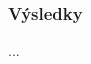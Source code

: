 \documentclass[presentation.tex]{subfiles}
\begin{document}
	
\begin{frame}
\frametitle{Výsledky}
...
\end{frame}
	
\end{document}
